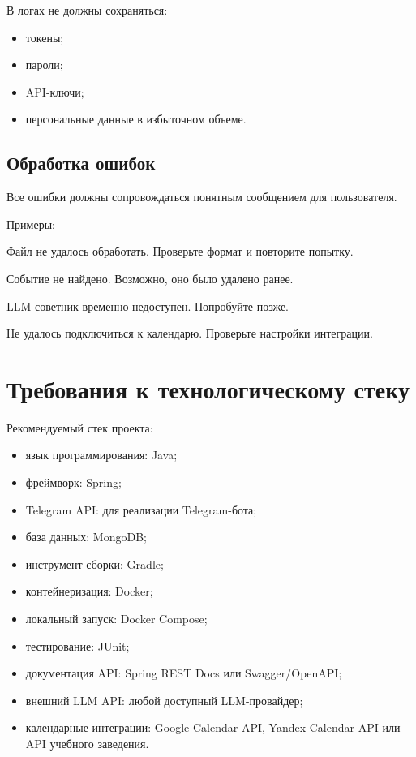 \documentclass[10pt,a4paper,final]{article} %
\begin{document}
В логах не должны сохраняться:

\begin{itemize}
    \item токены;
    \item пароли;
    \item API-ключи;
    \item персональные данные в избыточном объеме.
\end{itemize}

\subsection{Обработка ошибок}

Все ошибки должны сопровождаться понятным сообщением для пользователя.

Примеры:

\begin{Code}
Файл не удалось обработать. Проверьте формат и повторите попытку.
\end{Code}

\begin{Code}
Событие не найдено. Возможно, оно было удалено ранее.
\end{Code}

\begin{Code}
LLM-советник временно недоступен. Попробуйте позже.
\end{Code}

\begin{Code}
Не удалось подключиться к календарю. Проверьте настройки интеграции.
\end{Code}

\section{Требования к технологическому стеку}

Рекомендуемый стек проекта:

\begin{itemize}
    \item язык программирования: Java;
    \item фреймворк: Spring;
    \item Telegram API: для реализации Telegram-бота;
    \item база данных: MongoDB;
    \item инструмент сборки: Gradle;
    \item контейнеризация: Docker;
    \item локальный запуск: Docker Compose;
    \item тестирование: JUnit;
    \item документация API: Spring REST Docs или Swagger/OpenAPI;
    \item внешний LLM API: любой доступный LLM-провайдер;
    \item календарные интеграции: Google Calendar API, Yandex Calendar API или API учебного заведения.
\end{itemize}
\end{document}
